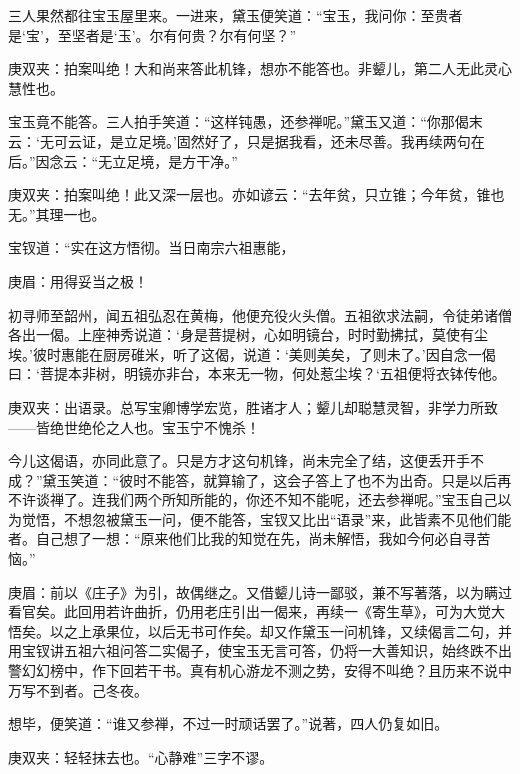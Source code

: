 \begin{parag}
    三人果然都往宝玉屋里来。一进来，黛玉便笑道：“宝玉，我问你：至贵者是‘宝’，至坚者是‘玉’。尔有何贵？尔有何坚？”\begin{note}庚双夹：拍案叫绝！大和尚来答此机锋，想亦不能答也。非颦儿，第二人无此灵心慧性也。\end{note}宝玉竟不能答。三人拍手笑道：“这样钝愚，还参禅呢。”黛玉又道：“你那偈末云：‘无可云证，是立足境。’固然好了，只是据我看，还未尽善。我再续两句在后。”因念云：“无立足境，是方干净。”\begin{note}庚双夹：拍案叫绝！此又深一层也。亦如谚云：“去年贫，只立锥；今年贫，锥也无。”其理一也。\end{note}宝钗道：“实在这方悟彻。当日南宗六祖惠能，\begin{note}庚眉：用得妥当之极！\end{note}初寻师至韶州，闻五祖弘忍在黄梅，他便充役火头僧。五祖欲求法嗣，令徒弟诸僧各出一偈。上座神秀说道：‘身是菩提树，心如明镜台，时时勤拂拭，莫使有尘埃。’彼时惠能在厨房碓米，听了这偈，说道：‘美则美矣，了则未了。’因自念一偈曰：‘菩提本非树，明镜亦非台，本来无一物，何处惹尘埃？‘五祖便将衣钵传他。\begin{note}庚双夹：出语录。总写宝卿博学宏览，胜诸才人；颦儿却聪慧灵智，非学力所致——皆绝世绝伦之人也。宝玉宁不愧杀！\end{note}今儿这偈语，亦同此意了。只是方才这句机锋，尚未完全了结，这便丢开手不成？”黛玉笑道：“彼时不能答，就算输了，这会子答上了也不为出奇。只是以后再不许谈禅了。连我们两个所知所能的，你还不知不能呢，还去参禅呢。”宝玉自己以为觉悟，不想忽被黛玉一问，便不能答，宝钗又比出“语录”来，此皆素不见他们能者。自己想了一想：“原来他们比我的知觉在先，尚未解悟，我如今何必自寻苦恼。”\begin{note}庚眉：前以《庄子》为引，故偶继之。又借颦儿诗一鄙驳，兼不写著落，以为瞒过看官矣。此回用若许曲折，仍用老庄引出一偈来，再续一《寄生草》，可为大觉大悟矣。以之上承果位，以后无书可作矣。却又作黛玉一问机锋，又续偈言二句，并用宝钗讲五祖六祖问答二实偈子，使宝玉无言可答，仍将一大善知识，始终跌不出警幻幻榜中，作下回若干书。真有机心游龙不测之势，安得不叫绝？且历来不说中万写不到者。己冬夜。\end{note}想毕，便笑道：“谁又参禅，不过一时顽话罢了。”说著，四人仍复如旧。\begin{note}庚双夹：轻轻抹去也。“心静难”三字不谬。\end{note}
\end{parag}


